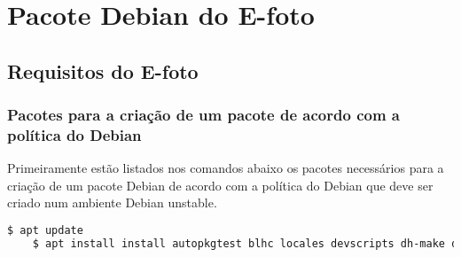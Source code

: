 \chapter{Pacote Debian do E-foto}
\section{Requisitos do E-foto}

\subsection{Pacotes para a criação de um pacote de acordo com a política do Debian}

Primeiramente estão listados nos comandos abaixo os pacotes necessários para a criação de um pacote Debian de acordo com a política do Debian que deve ser criado num ambiente Debian unstable. 

\begin{lstlisting}[language=bash]
	$ apt update
	$ apt install install autopkgtest blhc locales devscripts dh-make dput-ng git-buildpackage mc quilt spell tardiff tree
\end{lstlisting}


